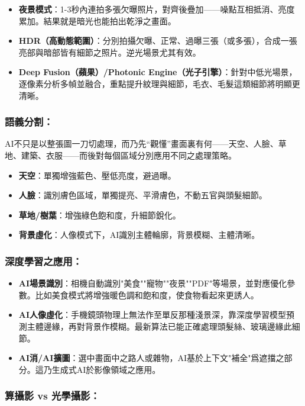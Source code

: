 \begin{itemize}
  \item \textbf{夜景模式}：1-3秒內連拍多張欠曝照片，對齊後疊加——噪點互相抵消、亮度累加。結果就是暗光也能拍出乾淨之畫面。
  \item \textbf{HDR（高動態範圍）}：分別拍攝欠曝、正常、過曝三張（或多張），合成一張亮部與暗部皆有細節之照片。逆光場景尤其有效。
  \item \textbf{Deep Fusion（蘋果）/Photonic Engine（光子引擎）}：針對中低光場景，逐像素分析多幀並融合，重點提升紋理與細節，毛衣、毛髮這類細節將明顯更清晰。
\end{itemize}

\subsubsection*{語義分割：}

AI不只是以整張圖一刀切處理，而乃先“觀懂”畫面裏有何——天空、人臉、草地、建築、衣服——而後對每個區域分別應用不同之處理策略。

\begin{itemize}
  \item \textbf{天空}：單獨增強藍色、壓低亮度，避過曝。
  \item \textbf{人臉}：識別膚色區域，單獨提亮、平滑膚色，不動五官與頭髮細節。
  \item \textbf{草地/樹葉}：增強綠色飽和度，升細節銳化。
  \item \textbf{背景虛化}：人像模式下，AI識別主體輪廓，背景模糊、主體清晰。
\end{itemize}

\subsubsection*{深度學習之應用：}

\begin{itemize}
  \item \textbf{AI場景識別}：相機自動識別"美食""寵物""夜景""PDF"等場景，並對應優化參數。比如美食模式將增強暖色調和飽和度，使食物看起來更誘人。
  \item \textbf{AI人像虛化}：手機鏡頭物理上無法作至單反那種淺景深，靠深度學習模型預測主體邊緣，再對背景作模糊。最新算法已能正確處理頭髮絲、玻璃邊緣此細節。
  \item \textbf{AI消/AI擴圖}：選中畫面中之路人或雜物，AI基於上下文"補全"爲遮擋之部分。這乃生成式AI於影像領域之應用。
\end{itemize}

\subsubsection*{算攝影 vs 光學攝影：}

